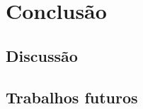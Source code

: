 \chapter{Conclusão}
\label{cha:trabalhos_futuros}

\section{Discussão} %
\label{sec:discuss_o}

\section{Trabalhos futuros} %
\label{sec:trabalhos_futuros}